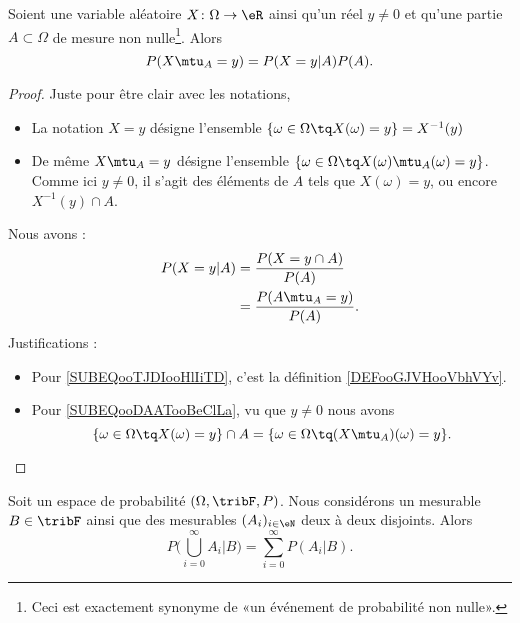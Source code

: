 \begin{lemma}
	Soient une variable aléatoire \( X\colon \Omega\to \eR\) ainsi qu'un réel \( y\neq 0\) et qu'une partie \( A\subset \Omega\) de mesure non nulle\footnote{Ceci est exactement synonyme de «un événement de probabilité non nulle».}. Alors
	\begin{equation}
		P(X\mtu_A=y)=P(X=y|A)P(A).
	\end{equation}
\end{lemma}

\begin{proof}
	Juste pour être clair avec les notations,
	\begin{itemize}
		\item La notation \( X=y\) désigne l'ensemble \( \{ \omega\in \Omega\tq X(\omega)=y \}=X^{-1}(y)\)
		\item
		      De même \( X\mtu_A=y\) désigne l'ensemble \( \{ \omega\in \Omega\tq X(\omega)\mtu_A(\omega)=y \}\). Comme ici \( y\neq 0\), il s'agit des éléments de \( A\) tels que \( X(\omega)=y\), ou encore \( X^{-1}(y)\cap A\).
	\end{itemize}
	Nous avons :
	\begin{subequations}
		\begin{align}
			P(X=y|A) & =\frac{ P(X=y\cap A) }{ P(A) }     \label{SUBEQooTJDIooHlIiTD}     \\
			         & =\frac{ P(A\mtu_A=y) }{ P(A) }.        \label{SUBEQooDAATooBeClLa}
		\end{align}
	\end{subequations}
	Justifications :
	\begin{itemize}
		\item Pour \eqref{SUBEQooTJDIooHlIiTD}, c'est la définition \ref{DEFooGJVHooVbhVYv}.
		\item Pour \eqref{SUBEQooDAATooBeClLa}, vu que \( y\neq 0\) nous avons
		      \begin{equation}
			      \{ \omega\in \Omega\tq X(\omega)=y \}\cap A=\{ \omega\in \Omega\tq (X\mtu_A)(\omega)=y \}.
		      \end{equation}
	\end{itemize}
\end{proof}

\begin{lemma}        \label{LEMooRDXRooQLMRGF}
	Soit un espace de probabilité \( (\Omega,\tribF,P)\). Nous considérons un mesurable \(B\in \tribF \) ainsi que des mesurables \( (A_i)_{i\in \eN}\) deux à deux disjoints. Alors
	\begin{equation}
		P\big( \bigcup_{i=0}^{\infty}A_i|B \big)=\sum_{i=0}^{\infty}P(A_i|B).
	\end{equation}
\end{lemma}

